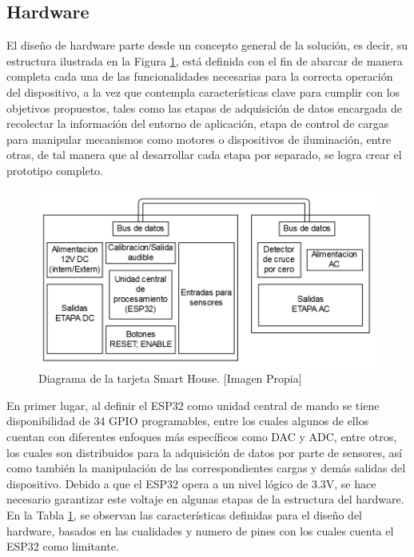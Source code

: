 \subsection{Hardware}\label{sec:hw}

El diseño de hardware parte desde un concepto general de la solución, es decir, su estructura ilustrada en la Figura \ref{fig:tar}, está definida con el fin de abarcar de manera completa cada una de las funcionalidades necesarias para la correcta operación del dispositivo, a la vez que contempla características clave para cumplir con los objetivos propuestos, tales como las etapas de adquisición de datos encargada de recolectar la información del entorno de aplicación, etapa de control de cargas para manipular mecanismos como motores o dispositivos de iluminación, entre otras, de tal manera que al desarrollar cada etapa por separado, se logra crear el prototipo completo.\\

\begin{figure}[!t]
	\centering
	\caption[Diagrama de la tarjeta Smart House.]{Diagrama de la tarjeta Smart House.  [Imagen Propia]}
	\label{fig:tar}
	\includegraphics[width=0.7\linewidth]{Imagenes/Tarjeta}
\end{figure}

En primer lugar, al definir el ESP32 como unidad central de mando se tiene disponibilidad de 34 GPIO programables, entre los cuales algunos de ellos cuentan con diferentes enfoques más específicos como DAC y ADC, entre otros, los cuales son distribuidos para la adquisición de datos por parte de sensores, así como también la manipulación de las correspondientes cargas y demás salidas del dispositivo. Debido a que el ESP32 opera a un nivel lógico de 3.3V, se hace necesario garantizar este voltaje en algunas etapas de la estructura del hardware.\\

En la Tabla \ref{fig:tar}, se observan las características definidas para el diseño del hardware, basados en las cualidades y numero de pines con los cuales cuenta el ESP32 como limitante.\\

